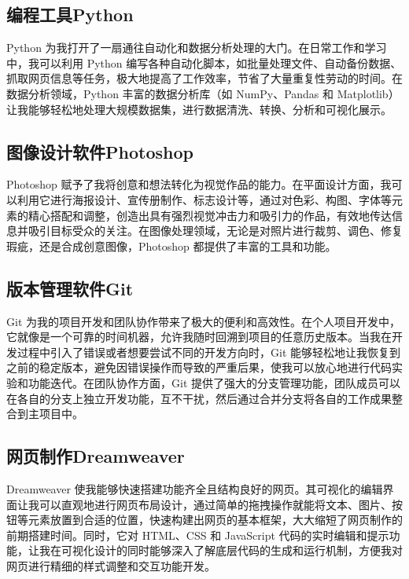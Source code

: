 \documentclass[supercite]{Experimental_Report}
\theoremstyle{definition}
\begin{document}
\subsection{编程工具Python}
Python 为我打开了一扇通往自动化和数据分析处理的大门。在日常工作和学习中，我可以利用 Python 编写各种自动化脚本，如批量处理文件、自动备份数据、抓取网页信息等任务，极大地提高了工作效率，节省了大量重复性劳动的时间。在数据分析领域，Python 丰富的数据分析库（如 NumPy、Pandas 和 Matplotlib）让我能够轻松地处理大规模数据集，进行数据清洗、转换、分析和可视化展示。


\subsection{图像设计软件Photoshop}
Photoshop 赋予了我将创意和想法转化为视觉作品的能力。在平面设计方面，我可以利用它进行海报设计、宣传册制作、标志设计等，通过对色彩、构图、字体等元素的精心搭配和调整，创造出具有强烈视觉冲击力和吸引力的作品，有效地传达信息并吸引目标受众的关注。在图像处理领域，无论是对照片进行裁剪、调色、修复瑕疵，还是合成创意图像，Photoshop 都提供了丰富的工具和功能。


\subsection{版本管理软件Git}
Git 为我的项目开发和团队协作带来了极大的便利和高效性。在个人项目开发中，它就像是一个可靠的时间机器，允许我随时回溯到项目的任意历史版本。当我在开发过程中引入了错误或者想要尝试不同的开发方向时，Git 能够轻松地让我恢复到之前的稳定版本，避免因错误操作而导致的严重后果，使我可以放心地进行代码实验和功能迭代。在团队协作方面，Git 提供了强大的分支管理功能，团队成员可以在各自的分支上独立开发功能，互不干扰，然后通过合并分支将各自的工作成果整合到主项目中。


\subsection{网页制作Dreamweaver}
Dreamweaver 使我能够快速搭建功能齐全且结构良好的网页。其可视化的编辑界面让我可以直观地进行网页布局设计，通过简单的拖拽操作就能将文本、图片、按钮等元素放置到合适的位置，快速构建出网页的基本框架，大大缩短了网页制作的前期搭建时间。同时，它对 HTML、CSS 和 JavaScript 代码的实时编辑和提示功能，让我在可视化设计的同时能够深入了解底层代码的生成和运行机制，方便我对网页进行精细的样式调整和交互功能开发。



\nocite{*} %

%
%
\end{document}
